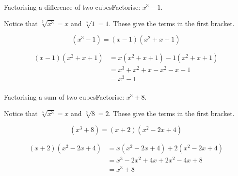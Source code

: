 % 
% 

\begin{wex}{Factorising a difference of two cubes}{Factorise: $x^{3} - 1$.}
{
Notice that $\sqrt[3]{x^{3}} = x$ and $\sqrt[3]{1} = 1$. These give the terms in the first bracket.

\begin{equation*}
  (x^{3} - 1) = (x-1)(x^{2}+x+1)
\end{equation*}

\begin{align*}
  (x-1)(x^{2}+x+1) &= x(x^{2}+x+1)-1(x^{2}+x+1)\\
		   &=x^{3}+x^{2}+x-x^{2}-x-1\\
		   &=x^{3}-1\\
\end{align*}
}
\end{wex}

\begin{wex}{Factorising a sum of two cubes}{Factorise: $x^{3}+8$.}
{
Notice that $\sqrt[3]{x^{3}} = x$ and $\sqrt[3]{8} = 2$. These give the terms in the first bracket.

\begin{equation*}
  (x^{3} +8) = (x+2)(x^{2}-2x+4)
\end{equation*}

\begin{align*}
  (x+2)(x^{2}-2x+4) &= x(x^{2}-2x+4)+2(x^{2}-2x+4)\\
		   &=x^{3}-2x^{2}+4x+2x^{2}-4x+8\\
		   &=x^{3}+8\\
\end{align*}
}
\end{wex}

